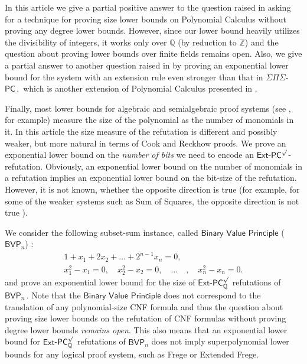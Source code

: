 \documentclass[11pt]{article}
\newcommand{\Q}{{\mathbb Q}}
\newcommand{\Z}{{\mathbb Z}}
\begin{document}
In this %
article  %
we give a partial positive answer to the question raised in \cite{IMP19_new} asking for a technique
for proving size lower bounds on Polynomial Calculus without proving any degree lower bounds. However,
since our lower bound heavily utilizes the divisibility of
%
integers,  %
it works only %
over  %
$\Q$ (by reduction to $\Z$) and the question about proving lower bounds over finite fields remains open.
Also, we give a partial answer to another question raised in \cite{IMP19_new} by proving an exponential lower bound for the system with an extension rule even stronger than that in $\Sigma\Pi\Sigma$-%
$\mathsf{PC}\,,$ %
which is another extension of Polynomial Calculus presented in %
%
%
%
\cite{IMP19_new}. 
%

%
%
%
%
%

Finally, most lower bounds for algebraic and semialgebraic proof systems (see  \cite{MR1691494,IPS99}, 
for example) measure the size of the polynomial as the number of monomials in it. In
this %
article  %
the size measure of the refutation is different and possibly weaker, but more natural in terms of Cook and Reckhow proofs. We prove an exponential lower bound on the \emph{number of bits} we need to encode an $\mathsf{Ext}$-$\mathsf{PC}^{\surd}$-refutation. Obviously, an exponential lower bound on the number of monomials in a refutation implies an exponential lower bound on the bit-size of the refutation. However, it is not known, whether
%
the opposite direction is true  %
(for example, for some of the weaker systems such as Sum of Squares,
%
the opposite direction  %
%
is not true \cite{odonnell:LIPIcs:2017:8198, Raghavendra2017OnTB, 10.1109/LICS52264.2021.9470545}).    


We consider the following subset-sum instance, called $\mathsf{Binary}$ $\mathsf{Value}$ $\mathsf{Principle}$ ($\mathsf{BVP}_n$) \cite{AGHT19_new,PT18_new}:
\begin{align*}
1 + x_1 + 2 x_2 + \ldots + 2^{n - 1} x_n = 0, \\
x_1^2 - x_1 = 0, \quad x_2^2 - x_2 = 0, \quad \ldots \quad, \quad x_n^2 - x_n = 0.
\end{align*}
and prove an exponential lower bound for the size of $\mathsf{Ext}$-$\mathsf{PC}_{\Q}^{\surd}$ refutations of %
$\mathsf{BVP}_n\,.$ %
 Note that the $\mathsf{Binary}$ $\mathsf{Value}$ $\mathsf{Principle}$ does not correspond to the translation of any %
polynomial-size CNF formula %
%
%
and thus the question about proving size lower %
bounds %
on the refutation of %
CNF formulas %
without proving degree lower bounds \emph{remains open}. This also means that
an  %
exponential lower bound for $\mathsf{Ext}$-$\mathsf{PC}_{\Q}^{\surd}$ refutations of $\mathsf{BVP}_n$ does not imply
%
superpolynomial 
%
lower bounds for any logical proof system, such as Frege or Extended Frege.
%
\end{document}
